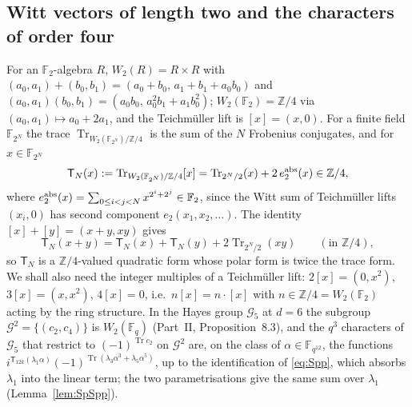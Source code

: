 ﻿\documentclass[12pt,a4paper]{amsart}
\theoremstyle{definition}
\newcommand{\F}{\mathbb{F}}
\newcommand{\Z}{\mathbb{Z}}
\newcommand{\G}{\mathcal{G}}
\newcommand{\Tr}{\operatorname{Tr}}
\begin{document}
\subsection{Witt vectors of length two and the characters of order four}\label{subsec:witt}
For an $\F_2$-algebra $R$, $W_2(R)=R\times R$ with $(a_0,a_1)+(b_0,b_1)=(a_0+b_0,\,a_1+b_1+a_0b_0)$ and $(a_0,a_1)(b_0,b_1)=(a_0b_0,\,a_0^2b_1+a_1b_0^2)$; $W_2(\F_2)=\Z/4$ via $(a_0,a_1)\mapsto a_0+2a_1$, and the Teichm\"uller lift is $[x]=(x,0)$. For a finite field $\F_{2^N}$ the trace $\Tr_{W_2(\F_{2^N})/\Z/4}$ is the sum of the $N$ Frobenius conjugates, and for $x\in\F_{2^N}$
\begin{equation}\label{eq:T}
\mathsf T_N(x):=\Tr_{W_2(\F_{2^N})/\Z/4}[x]=\Tr_{2^N/2}(x)+2\,e_2^{\rm abs}(x)\in\Z/4,
\end{equation}
where $e_2^{\rm abs}(x)=\sum_{0\le i<j<N}x^{2^i+2^j}\in\F_2$, since the Witt sum of Teichm\"uller lifts $(x_i,0)$ has second component $e_2(x_1,x_2,\dots)$. The identity $[x]+[y]=(x+y,xy)$ gives
\begin{equation}\label{eq:Tpolar}
\mathsf T_N(x+y)=\mathsf T_N(x)+\mathsf T_N(y)+2\Tr_{2^N/2}(xy)\qquad(\text{in }\Z/4),
\end{equation}
so $\mathsf T_N$ is a $\Z/4$-valued quadratic form whose polar form is twice the trace form. We shall also need the integer multiples of a Teichm\"uller lift: $2[x]=(0,x^2)$, $3[x]=(x,x^2)$, $4[x]=0$, i.e.\ $n[x]=n\cdot[x]$ with $n\in\Z/4=W_2(\F_2)$ acting by the ring structure. In the Hayes group $\G_5$ at $d=6$ the subgroup $\G^2=\{(c_2,c_4)\}$ is $W_2(\F_q)$ (Part~II, Proposition~8.3), and the $q^3$ characters of $\G_5$ that restrict to $(-1)^{\Tr c_2}$ on $\G^2$ are, on the class of $\alpha\in\F_{q^{12}}$, the functions $i^{\mathsf T_{12k}(\lambda_1\alpha)}(-1)^{\Tr(\lambda_3\alpha^3+\lambda_5\alpha^5)}$, up to the identification of \eqref{eq:Spp}, which absorbs $\lambda_1$ into the linear term; the two parametrisations give the same sum over $\lambda_1$ (Lemma~\ref{lem:SpSpp}).
\end{document}
